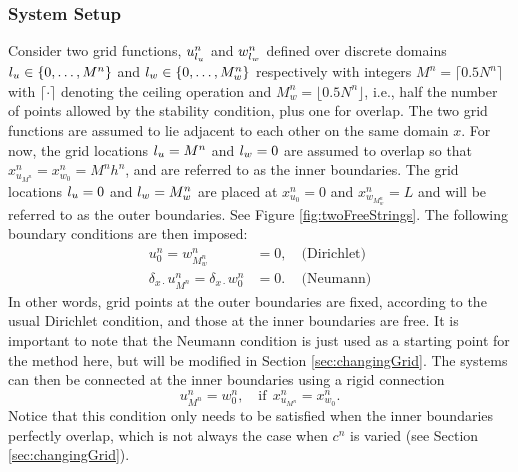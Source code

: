 \subsubsection{System Setup}\label{sec:systSetup}
Consider two grid functions, $u_{l_u}^n$ and $w_{l_w}^n$ defined over discrete domains ${l_u} \in \{0, \hdots, M^n\}$ and ${l_w} \in \{0, \hdots, M_w^n\}$ respectively with integers $M^n = \lceil 0.5N^n\rceil $ with $\lceil \cdot \rceil$ denoting the ceiling operation and $M_w^n = \lfloor 0.5N^n\rfloor$, i.e., half the number of points allowed by the stability condition, plus one for overlap. The two grid functions are assumed to lie adjacent to each other on the same domain $x$. For now, the grid locations ${l_u} = M^n$ and ${l_w} = 0$ are assumed to overlap so that $x_{u_{M^n}}^n = x_{w_0}^n = M^nh^n$, and are referred to as the inner boundaries. The grid locations ${l_u} = 0$ and ${l_w} = M_w^n$ are placed at $x_{u_0}^n = 0$ and $x_{w_{M_w^n}}^n = L$ and will be referred to as the outer boundaries. See Figure \ref{fig:twoFreeStrings}. The following boundary conditions are then imposed:
\begin{subequations}\label{eq:halfStringBoundaryCond}
    \begin{align}
        u_0^n = w_{M_w^n}^n &= 0,\quad \text{(Dirichlet)}\label{eq:halfStringBoundaryCondDirichlet}\\
        \delta_{x\cdot}u_{M^n}^n = \delta_{x\cdot}w_0^n &= 0.\, \quad\text{(Neumann)} \label{eq:halfStringBoundaryCondNeumann}
    \end{align}
\end{subequations}
In other words, grid points at the outer boundaries are fixed, according to the usual Dirichlet condition, and those at the inner boundaries are free. It is important to note that the Neumann condition is just used as a starting point for the method here, but will be modified in Section \ref{sec:changingGrid}.
%
%
The systems can then be connected at the inner boundaries using a rigid connection
\begin{equation}\label{eq:rigid}
    u_{M^n}^n = w_0^n, \quad \text{if}\ \ x_{u_{M^n}}^n = x_{w_0}^n.
\end{equation}
Notice that this condition only needs to be satisfied when the inner boundaries perfectly overlap, which is not always the case when $c^n$ is varied (see Section \ref{sec:changingGrid}).

